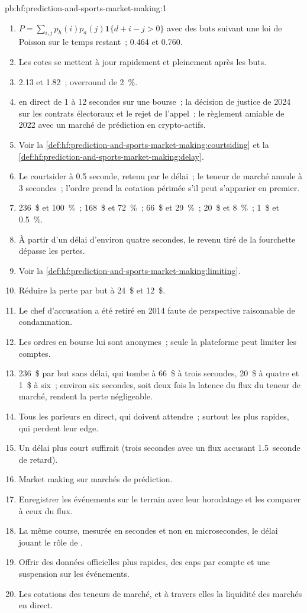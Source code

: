 \begin{solution}{pb:hf:prediction-and-sports-market-making:1}
\begin{enumerate}
\item $P=\sum_{i,j}p_h(i)p_a(j)\mathbf 1\{d+i-j>0\}$ avec des buts suivant une loi de Poisson sur le temps restant~; 0.464 et 0.760.
\item Les cotes se mettent à jour rapidement et pleinement après les buts.
\item 2.13 et 1.82~; overround de 2~\%.
\item {} en direct de 1 à 12 secondes sur une bourse~; la décision de justice de 2024 sur les contrats électoraux et le rejet de l'appel~; le
règlement amiable de 2022 avec un marché de prédiction en crypto-actifs.
\item Voir la \cref{def:hf:prediction-and-sports-market-making:courtsiding} et la \cref{def:hf:prediction-and-sports-market-making:delay}.
\item Le courtsider à 0.5 seconde, retenu par le délai~; le teneur de marché annule à 3 secondes~; l'ordre prend la cotation périmée s'il peut s'apparier en premier.
\item 236~\$ et 100~\%~; 168~\$ et 72~\%~; 66~\$ et 29~\%~; 20~\$ et 8~\%~; 1~\$ et 0.5~\%.
\item À partir d'un délai d'environ quatre secondes, le revenu tiré de la fourchette dépasse les pertes.
\item Voir la \cref{def:hf:prediction-and-sports-market-making:limiting}.
\item Réduire la perte par but à 24~\$ et 12~\$.
\item Le chef d'accusation a été retiré en 2014 faute de perspective raisonnable de condamnation.
\item Les ordres en bourse lui sont anonymes~; seule la plateforme peut limiter les comptes.
\item 236~\$ par but sans délai, qui tombe à 66~\$ à trois secondes, 20~\$ à quatre et 1~\$ à six~; environ six secondes, soit deux fois la latence du flux du teneur de marché,
rendent la perte négligeable.
\item Tous les parieurs en direct, qui doivent attendre~; surtout les plus rapides, qui perdent leur edge.
\item Un délai plus court suffirait (trois secondes avec un flux accusant 1.5~seconde de retard).
\item Market making sur marchés de prédiction.
\item Enregistrer les événements sur le terrain avec leur horodatage et les comparer à ceux du flux.
\item La même course, mesurée en secondes et non en microsecondes, le délai jouant le rôle de .
\item Offrir des données officielles plus rapides, des caps par compte et une suspension sur les événements.
\item Les cotations des teneurs de marché, et à travers elles la liquidité des marchés en direct.
\end{enumerate}
\end{solution}

